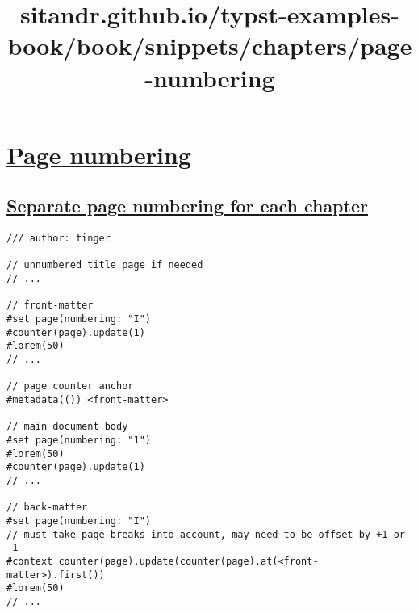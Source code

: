 \title{sitandr.github.io/typst-examples-book/book/snippets/chapters/page-numbering}

\section{\texorpdfstring{\hyperref[page-numbering]{Page
numbering}}{Page numbering}}\label{page-numbering}

\subsection{\texorpdfstring{\hyperref[separate-page-numbering-for-each-chapter]{Separate
page numbering for each
chapter}}{Separate page numbering for each chapter}}\label{separate-page-numbering-for-each-chapter}

\begin{verbatim}
/// author: tinger

// unnumbered title page if needed
// ...

// front-matter
#set page(numbering: "I")
#counter(page).update(1)
#lorem(50)
// ...

// page counter anchor
#metadata(()) <front-matter>

// main document body
#set page(numbering: "1")
#lorem(50)
#counter(page).update(1)
// ...

// back-matter
#set page(numbering: "I")
// must take page breaks into account, may need to be offset by +1 or -1
#context counter(page).update(counter(page).at(<front-matter>).first())
#lorem(50)
// ...
\end{verbatim}

\pandocbounded{}

\pandocbounded{}

\pandocbounded{}
